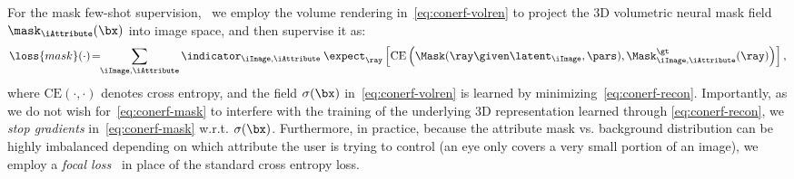     For the mask few-shot supervision, \
    we employ the volume rendering in~\cref{eq:conerf-volren} to project the 3D volumetric neural mask field $\mask_\iAttribute(\bx)$ into image space, and then supervise it as:
    \newcommand{\crossentropy}[2]{\text{CE}\left(#1,#2\right)}
    \begin{equation}
      \loss{mask}(\cdot) \!= \!\!\sum_{\iImage, \iAttribute}
      \indicator_{\iImage, \iAttribute} \:
      \expect_\ray
      \left[
        \crossentropy
        {\Mask(\ray \given \latent_\iImage, \pars)}
        {\Mask^\gt_{\iImage, \iAttribute}(\ray)}
        \right]
      ,
      \label{eq:conerf-mask}
    \end{equation}
    where $\crossentropy{\cdot}{\cdot}$ denotes cross entropy, and the field $\sigma(\bx)$ in~\cref{eq:conerf-volren} is learned by minimizing~\cref{eq:conerf-recon}.
    Importantly, as we do not wish for~\cref{eq:conerf-mask} to interfere with
    the training of the underlying 3D representation learned through
    \cref{eq:conerf-recon}, we \textit{stop gradients}
    in~\cref{eq:conerf-mask} w.r.t. $\sigma(\bx)$.
    Furthermore, in practice, because the attribute mask vs.
    background distribution can be highly imbalanced depending on which attribute the user is trying to control (\eg an eye only covers a very small portion of an image), we employ a \textit{focal loss}~\cite{lin2017focal} in place of the standard cross entropy loss.

